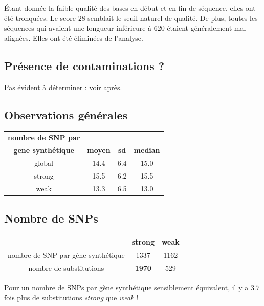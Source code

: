 \documentclass[a4paper]{tufte-handout}
\begin{document}
Étant donnée la faible qualité des bases en début et en fin de séquence, elles
ont été tronquées. Le score \(28\) semblait le seuil naturel de qualité. De plus,
toutes les séquences qui avaient une longueur inférieure à \(620\) étaient
généralement mal alignées. Elles ont été éliminées de l'analyse. 

\subsection{Présence de contaminations ?}
\label{sec:orgheadline2}
Pas évident à déterminer : voir après. 
\subsection{Observations générales}
\label{sec:orgheadline3}

\begin{center}
\small
\begin{tabular}{cccc}
\toprule
\textbf{nombre de SNP par} &  &  & \\
\textbf{gene synthétique} & \textbf{moyen} & \textbf{sd} & \textbf{median}\\
\midrule
global & 14.4 & 6.4 & 15.0\\
strong & 15.5 & 6.2 & 15.5\\
weak & 13.3 & 6.5 & 13.0\\
\bottomrule
\end{tabular}
\end{center}

\subsection{Nombre de SNPs}
\label{sec:orgheadline4}

\begin{center}
\small
\begin{tabular}{ccc}
\toprule
 & \textbf{strong} & \textbf{weak}\\
\midrule
nombre de SNP par gène synthétique & 1337 & 1162\\
nombre de substitutions & \textbf{1970} & 529\\
\bottomrule
\end{tabular}
\end{center}

Pour un nombre de SNPs par gène synthétique sensiblement équivalent, il y a
\(3.7\) fois plus de substitutions \emph{strong} que \emph{weak} !
\end{document}
